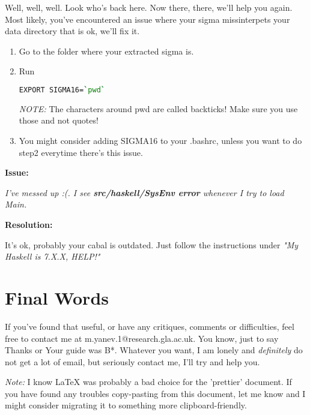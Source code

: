 \documentclass{article}
\begin{document}
        Well, well, well. Look who's back here. Now there, there, we'll help you again. Most likely, you've encountered an issue where your sigma missinterpets your data directory that is ok, we'll fix it.
        \begin{enumerate}
             
        
        \item Go to the folder where your extracted sigma is.
        \item Run
                 \begin{lstlisting}[language=Bash]
                         EXPORT SIGMA16=`pwd`
\end{lstlisting}
        
        \textit{NOTE:} The characters around pwd are called backticks! Make sure you use those and not quotes!
	\item You might consider adding SIGMA16 to your .bashrc, unless you want to do step2 everytime there's this issue.
    \end{enumerate}

 \textbf{Issue:} 
 
 \textit{I've messed up :(. I see \textbf{src/haskell/SysEnv error} whenever I try to load Main.}
 
 \textbf{Resolution:}
 
        It's ok, probably your cabal is outdated. Just follow the instructions under \textit{"My Haskell is 7.X.X, HELP!"}

\section{Final Words}
 If you've found that useful, or have any critiques, comments or difficulties, feel free to contact me at m.yanev.1@research.gla.ac.uk. You know, just to say Thanks or Your guide was B*. Whatever you want, I am lonely and \textit{definitely} do not get a lot of email, but seriously contact me, I'll try and help you.
 
 \textit{Note:}
  I know LaTeX was probably a bad choice for the 'prettier' document. If you have found any troubles copy-pasting from this document, let me know and I might consider migrating it to something more clipboard-friendly.
\end{document}
